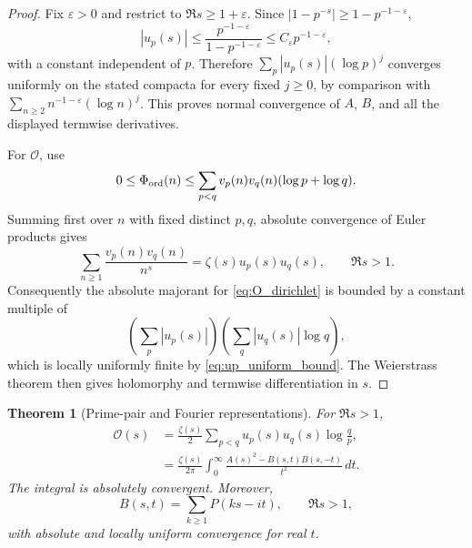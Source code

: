 \documentclass[11pt]{amsart}
\numberwithin{equation}{section}
\theoremstyle{plain}
\newtheorem{theorem}{Theorem}[section]
\theoremstyle{definition}
\theoremstyle{remark}
\begin{document}
\begin{proof}
Fix \(\varepsilon>0\) and restrict to \(\Re s\ge1+\varepsilon\).  Since
\(|1-p^{-s}|\ge1-p^{-1-\varepsilon}\),
\begin{equation}
|u_p(s)|
\le
\frac{p^{-1-\varepsilon}}{1-p^{-1-\varepsilon}}
\le C_\varepsilon p^{-1-\varepsilon},
\label{eq:up_uniform_bound}
\end{equation}
with a constant independent of \(p\).  Therefore
\(\sum_p|u_p(s)|(\log p)^j\) converges uniformly on the stated compacta for
every fixed \(j\ge0\), by comparison with
\(\sum_{n\ge2}n^{-1-\varepsilon}(\log n)^j\).
This proves normal convergence of \(A\), \(B\), and all the displayed
termwise derivatives.

For \(\mathcal O\), use
\begin{equation}
0\le \Phi_{\rm ord}(n)
\le
\sum_{p<q}v_p(n)v_q(n)(\log p+\log q).
\label{eq:Phi_ord_majorant}
\end{equation}
Summing first over \(n\) with fixed distinct \(p,q\), absolute convergence of
Euler products gives
\begin{equation}
\sum_{n\ge1}\frac{v_p(n)v_q(n)}{n^s}
=
\zeta(s)u_p(s)u_q(s),
\qquad \Re s>1.
\label{eq:vpvq_euler_identity}
\end{equation}
Consequently the absolute majorant for \eqref{eq:O_dirichlet} is bounded by a
constant multiple of
\begin{equation}
\left(\sum_p|u_p(s)|\right)
\left(\sum_q|u_q(s)|\log q\right),
\label{eq:O_absolute_majorant}
\end{equation}
which is locally uniformly finite by \eqref{eq:up_uniform_bound}.  The
Weierstrass theorem then gives holomorphy and termwise differentiation in
\(s\).
\end{proof}

\begin{theorem}[Prime-pair and Fourier representations]
\label{thm:O_prime_pair_fourier}
For \(\Re s>1\),
\begin{align}
\mathcal O(s)
&=
\frac{\zeta(s)}2
\sum_{p<q}u_p(s)u_q(s)\log\frac qp,
\label{eq:O_prime_pair}\\
&=
\frac{\zeta(s)}{2\pi}
\int_0^\infty
\frac{A(s)^2-B(s,t)B(s,-t)}{t^2}\,dt.
\label{eq:O_t_integral}
\end{align}
The integral is absolutely convergent.  Moreover,
\begin{equation}
B(s,t)=\sum_{k\ge1}P(ks-it),
\qquad \Re s>1,
\label{eq:B_prime_zeta}
\end{equation}
with absolute and locally uniform convergence for real \(t\).
\end{theorem}
\end{document}
